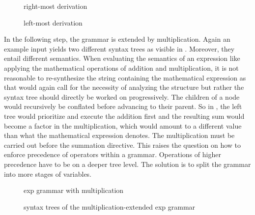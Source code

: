 \begin{figure}
	\centering
	
	

	\caption{right-most derivation}
	\label{fig:grammar_exp_RR}
\end{figure}

\begin{figure}
	

	\caption{left-most derivation}
	\label{fig:grammar_example_exp_LR}
\end{figure}

\FloatBarrier

In the following step, the grammar is extended by multiplication. Again an example input  yields two different syntax trees as visible in . Moreover, they entail different semantics. When evaluating the semantics of an expression like applying the mathematical operations of addition and multiplication, it is not reasonable to re-synthesize the string containing the mathematical expression as that would again call for the necessity of analyzing the structure but rather the syntax tree should directly be worked on progressively. The children of a node would recursively be conflated before advancing to their parent. So in , the left tree would prioritize and execute the addition first and the resulting sum would become a factor in the multiplication, which would amount to a different value than what the mathematical expression  denotes. The multiplication must be carried out before the summation directive. This raises the question on how to enforce precedence of operators within a grammar. Operations of higher precedence have to be on a deeper tree level. The solution is to split the grammar into more stages of variables.

\begin{figure}
	\centering

	

	\caption{exp grammar with multiplication}
	\label{fig:grammar_ambPrec}
\end{figure}

\begin{figure}
	\begin{center}
		
	\end{center}

	\caption{syntax trees of the multiplication-extended exp grammar}
	\label{fig:tree_diffSemantics}
\end{figure}

